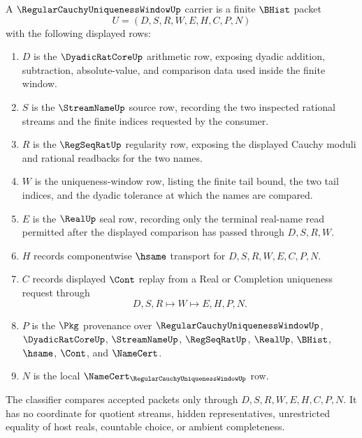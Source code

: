\begin{definition}
\label{def:regular-cauchy-uniqueness-window-carrier}
A $\RegularCauchyUniquenessWindowUp$ carrier is a finite $\BHist$ packet
$$
U=(D,S,R,W,E,H,C,P,N)
$$
with the following displayed rows:
\begin{enumerate}
\item $D$ is the $\DyadicRatCoreUp$ arithmetic row, exposing dyadic addition, subtraction, absolute-value, and comparison data used inside the finite window.
\item $S$ is the $\StreamNameUp$ source row, recording the two inspected rational streams and the finite indices requested by the consumer.
\item $R$ is the $\RegSeqRatUp$ regularity row, exposing the displayed Cauchy moduli and rational readbacks for the two names.
\item $W$ is the uniqueness-window row, listing the finite tail bound, the two tail indices, and the dyadic tolerance at which the names are compared.
\item $E$ is the $\RealUp$ seal row, recording only the terminal real-name read permitted after the displayed comparison has passed through $D,S,R,W$.
\item $H$ records componentwise $\hsame$ transport for $D,S,R,W,E,C,P,N$.
\item $C$ records displayed $\Cont$ replay from a Real or Completion uniqueness request through
$$
D,S,R \longmapsto W \longmapsto E,H,P,N .
$$
\item $P$ is the $\Pkg$ provenance over $\RegularCauchyUniquenessWindowUp$, $\DyadicRatCoreUp$, $\StreamNameUp$, $\RegSeqRatUp$, $\RealUp$, $\BHist$, $\hsame$, $\Cont$, and $\NameCert$.
\item $N$ is the local $\NameCert_{\RegularCauchyUniquenessWindowUp}$ row.
\end{enumerate}
The classifier compares accepted packets only through $D,S,R,W,E,H,C,P,N$. It has no coordinate for quotient streams, hidden representatives, unrestricted equality of host reals, countable choice, or ambient completeness.
\end{definition}

